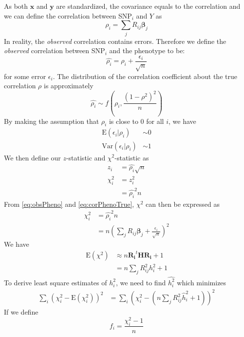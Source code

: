 			As both $\boldsymbol{x}$ and $\boldsymbol{y}$ are standardized, the covariance equals to the correlation and we can define the correlation between \gls{SNP}$_i$ and $Y$ as
			\begin{equation}
				\rho_i = \sum_j{R_{ij}\boldsymbol{\beta}_j}
				\label{eq:corPhenoTrue}
			\end{equation}
			In reality, the \emph{observed} correlation contains errors. 
			Therefore we define the \emph{observed} correlation between \gls{SNP}$_i$ and the phenotype to be:
			\begin{equation}
			\hat{\rho_i} = \rho_i+\frac{\epsilon_i}{\sqrt{n}}
			\label{eq:obsPheno}
			\end{equation}
			for some error $\epsilon_i$. 
			The distribution of the correlation coefficient about the true correlation $\rho$ is approximately
			$$
				\hat{\rho_i}\sim f(\rho_i, \frac{(1-\rho^2)^2}{n})
			$$
			By making the assumption that $\rho_i$ is close to 0 for all $i$, we have 
			\begin{align*}
				\mathrm{E}(\epsilon_i|\rho_i)&\sim 0\\
				\mathrm{Var}(\epsilon_i|\rho_i)&\sim 1
			\end{align*}
			We then define our $z$-statistic and $\chi^2$-statistic as
			\begin{align*}
				z_i &= \hat{\rho_i}\sqrt{n} \\
				\chi^2_i &= z_i^2\\
				&=\hat{\rho_i}^2n
			\end{align*}
			From \cref{eq:obsPheno} and \cref{eq:corPhenoTrue}, $\chi^2$ can then be expressed as
			\begin{align*}
			\chi^2_i&=\hat{\rho_i}^2n\\
			&=n(\sum_j{R_{ij}\boldsymbol{\beta}_j}+\frac{\epsilon_i}{\sqrt{n}})^2
			\end{align*}
			We have
			\begin{align*}
			\mathrm{E}(\chi^2) &\approx n\boldsymbol{R_i}^t\boldsymbol{HR_i}+1 \nonumber\\
			&=n\sum_j{R^2_{ij}h_i^2}+1
			\end{align*}
			To derive least square estimates of $h_i^2$, we need to find $\hat{h_i^2}$ which minimizes
			\begin{align*}
				\sum_i(\chi_i^2-\mathrm{E}(\chi_i^2))^2&=\sum_i(\chi_i^2-(n\sum_j{R^2_{ij}\hat{h}_i^2}+1))^2
			\end{align*}
			If we define 
			\begin{equation}
			f_i= \frac{\chi_i^2-1}{n}
			\label{eq:defineF}
			\end{equation}
